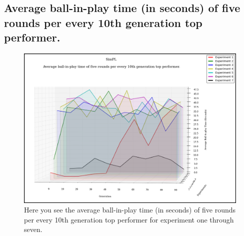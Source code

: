 \documentclass[a4paper,10pt]{article}
\begin{document}
\subsection{Average ball-in-play time (in seconds) of five rounds per every 10th generation top performer.}

\begin{figure}[H]  
  \centering
  \includegraphics[width=1\textwidth]{figures/all_10_tops_times.png}
  \caption{Here you see the average ball-in-play time (in seconds) of five rounds per every 10th generation top performer for experiment one through seven.}
  \label{fig:all_10_tops_times}
\end{figure}




\end{document}

